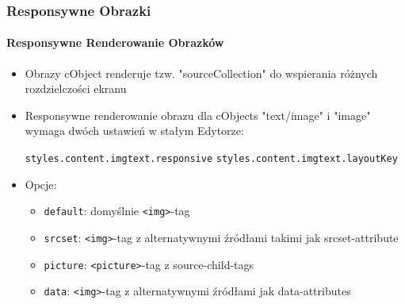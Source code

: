 \begin{frame}[fragile]
	\frametitle{Responsywne Obrazki}
	\framesubtitle{Responsywne Renderowanie Obrazków}

	\begin{itemize}
		\item Obrazy cObject renderuje tzw. "sourceCollection" do wspierania różnych rozdzielczości ekranu
		\item Responsywne renderowanie obrazu dla cObjects "text/image" i "image" wymaga dwóch ustawień w stałym Edytorze:

			\texttt{styles.content.imgtext.responsive}\newline
			\texttt{styles.content.imgtext.layoutKey}

		\item Opcje:

			\begin{itemize}
				\item \texttt{default}:	\tabto{2cm} domyślnie \texttt{<img>}-tag
				\item \texttt{srcset}:	\tabto{2cm} \texttt{<img>}-tag z alternatywnymi źródłami takimi jak srcset-attribute
				\item \texttt{picture}:	\tabto{2cm} \texttt{<picture>}-tag z source-child-tags
				\item \texttt{data}:	\tabto{2cm} \texttt{<img>}-tag z alternatywnymi źródłami jak data-attributes
			\end{itemize}

	\end{itemize}

\end{frame} 


